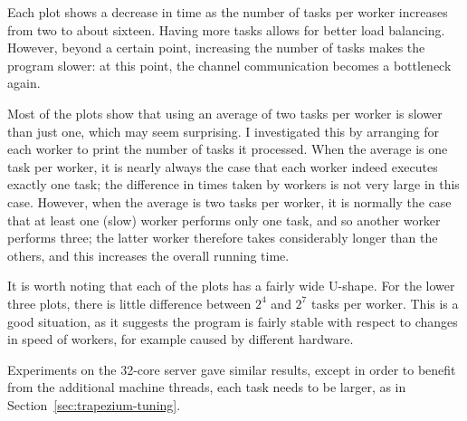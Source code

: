 Each plot shows a decrease in time as the number of tasks per worker increases
from two to about sixteen.  Having more tasks allows for better load
balancing.  However, beyond a certain point, increasing the number of tasks
makes the program slower: at this point, the channel communication becomes a
bottleneck again.

Most of the plots show that using an average of two tasks per worker is slower
than just one, which may seem surprising.  I investigated this by arranging
for each worker to print the number of tasks it processed.  When the average
is one task per worker, it is nearly always the case that each worker indeed
executes exactly one task; the difference in times taken by workers is not
very large in this case.  However, when the average is two tasks per worker,
it is normally the case that at least one (slow) worker performs only one
task, and so another worker performs three; the latter worker therefore takes
considerably longer than the others, and this increases the overall running
time.

It is worth noting that each of the plots has a fairly wide U-shape.  For the
lower three plots, there is little difference between $2^4$ and $2^7$ tasks
per worker.  This is a good situation, as it suggests the program is fairly
stable with respect to changes in speed of workers, for example caused by
different hardware. 

Experiments on the 32-core server gave similar results, except in order to
benefit from the additional machine threads, each task needs to be larger, as
in Section~\ref{sec:trapezium-tuning}.


